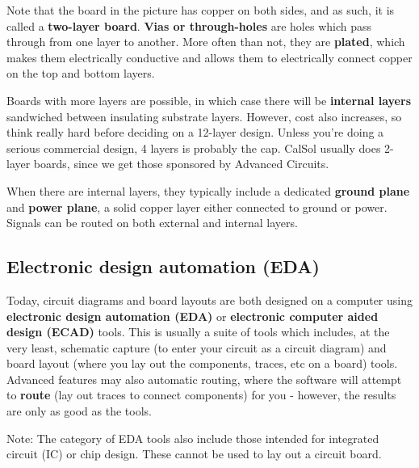 \documentclass[letterpaper]{article}
\begin{document}
{\sffamily\color[rgb]{0.30980393,0.5058824,0.7411765}
Note that the board in the picture has copper on both sides, and as such, it is called a \textbf{two-layer board}.
\textbf{Vias or through-holes} are holes which pass through from one layer to another. More often than not, they are
\textbf{plated}, which makes them electrically conductive and allows them to electrically connect copper on the top and
bottom layers.}


\bigskip

{\sffamily\color[rgb]{0.30980393,0.5058824,0.7411765}
Boards with more layers are possible, in which case there will be \textbf{internal layers} sandwiched between insulating
substrate layers. However, cost also increases, so think really hard before deciding on a 12-layer design. Unless
you're doing a serious commercial design, 4 layers is probably the cap. CalSol usually does 2-layer boards, since we
get those sponsored by Advanced Circuits.}

{\sffamily\color[rgb]{0.30980393,0.5058824,0.7411765}
When there are internal layers, they typically include a dedicated \textbf{ground plane} and \textbf{power plane}, a
solid copper layer either connected to ground or power. Signals can be routed on both external and internal layers.}

\subsection{Electronic design automation (EDA)}
\hypertarget{Toc337742675}{}{\sffamily\color[rgb]{0.30980393,0.5058824,0.7411765}
Today, circuit diagrams and board layouts are both designed on a computer using \textbf{electronic design automation
(EDA)} or \textbf{electronic computer aided design (ECAD)} tools. This is usually a suite of tools which includes, at
the very least, schematic capture (to enter your circuit as a circuit diagram) and board layout (where you lay out the
components, traces, etc on a board) tools. Advanced features may also automatic routing, where the software will
attempt to \textbf{route} (lay out traces to connect components) for you - however, the results are only as good as the
tools.}


\bigskip

{\sffamily\color[rgb]{0.30980393,0.5058824,0.7411765}
Note: The category of EDA tools also include those intended for integrated circuit (IC) or chip design. These cannot be
used to lay out a circuit board.}
\end{document}
